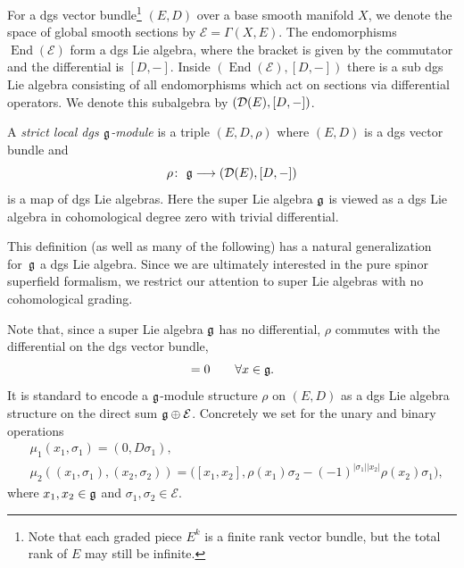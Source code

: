 \documentclass[pdftex]{sigma}
\numberwithin{equation}{section}
\def\cE{\mathcal E}\def\cF{\mathcal F}\def\cG{\mathcal G}\def\cH{\mathcal H}
\DeclareMathOperator{\End}{End}
\begin{document}
For a dgs vector bundle\footnote{Note that each graded piece $E^k$ is a finite rank vector bundle, but the total rank of $E$ may still be infinite.} $(E,D)$ over a base smooth manifold $X$, we denote the space of global smooth sections by $\cE = \Gamma(X,E)$. The endomorphisms $\End(\cE)$ form a dgs Lie algebra, where the bracket is given by the commutator and the differential is $[D,-]$. Inside $(\End(\cE), [D,-])$ there is a sub dgs Lie algebra consisting of all endomorphisms which act on sections via differential operators. We denote this subalgebra by $(\mathcal D(E), [D,-])$.
\begin{dfn}
	A \emph{strict local dgs $\mathfrak g$-module} is a triple $(E,D,\rho)$ where $(E,D)$ is a dgs vector bundle and
	\begin{equation*}
	\rho \colon \ \fg \longrightarrow (\cD(E) , [D,-] )
	\end{equation*}
	is a map of dgs Lie algebras. Here the super Lie algebra $\mathfrak g$ is viewed as a dgs Lie algebra in cohomological degree zero with trivial differential.
\end{dfn}
\begin{rmk}
	This definition (as well as many of the following) has a natural generalization for~$\mathfrak g$ a dgs Lie algebra. Since we are ultimately interested in the pure spinor superfield formalism, we restrict our attention to super Lie algebras with no cohomological grading.
\end{rmk}
Note that, since a super Lie algebra $\mathfrak g$ has no differential, $\rho$ commutes with the differential on the dgs vector bundle,
\begin{equation*}
[D,\rho(x)] = 0 \qquad \forall x \in \fg .
\end{equation*}
It is standard to encode a $\mathfrak g$-module structure $\rho$ on $(E,D)$ as a dgs Lie algebra structure on the direct sum $\fg \oplus \cE$. Concretely we set for the unary and binary operations
\begin{align}
&\mu_1(x_1,\sigma_1) = (0, D\sigma_1),\nonumber \\
&\mu_2((x_1,\sigma_1),(x_2,\sigma_2)) = \big([x_1,x_2] , \rho(x_1)\sigma_2 - (-1)^{|\sigma_1| |x_2|} \rho(x_2)\sigma_1 \big) ,\label{eq: lie structure on sum}
\end{align}
where $x_1,x_2 \in \mathfrak g$ and $\sigma_1,\sigma_2 \in \cE$.
\end{document}
